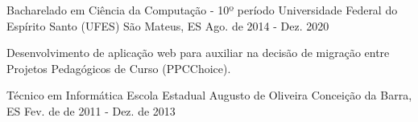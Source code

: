 

\begin{cventries}

  \cventry
    {Bacharelado em Ciência da Computação - 10º período} %
    {Universidade Federal do Espírito Santo (UFES)} %
    {São Mateus, ES} %
    {Ago. de 2014 - Dez. 2020} %
    {
      \begin{cvitems} %
        \item {Desenvolvimento de aplicação web para auxiliar na decisão de migração entre Projetos Pedagógicos de Curso (PPCChoice).}
      \end{cvitems}
    }
  \cventry
{Técnico em Informática} %
{Escola Estadual Augusto de Oliveira} %
{Conceição da Barra, ES} %
{Fev. de de 2011 - Dez. de 2013} %
{
	      \begin{cvitems} %
	      \end{cvitems}
}

\end{cventries}
